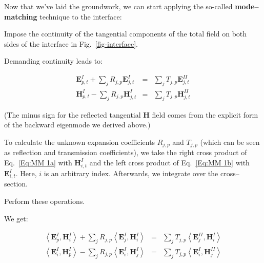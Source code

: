 \pagebreak


Now that we've laid the groundwork, we can start applying the so-called \textbf{mode--matching} technique to the interface:

\begin{cue}
Impose the continuity of the tangential components of the total field on both sides of the interface in Fig.~\ref{fig-interface}.  
\end{cue}

Demanding continuity leads to:  

\begin{eqnarray}
\mathbf{E}^{I}_{p,t}+\sum _{j}R_{j,p}\mathbf{E}^{I}_{j,t} & = & \sum _{j}T_{j,p}\mathbf{E}^{II}_{j,t}\label{Eq:MM 1a} \\
\mathbf{H}^{I}_{p,t}-\sum _{j}R_{j,p}\mathbf{H}^{I}_{j,t} & = & \sum _{j}T_{j,p}\mathbf{H}^{II}_{j,t}\label{Eq:MM 1b} 
\end{eqnarray}

(The minus sign for the reflected tangential ${\mathbf H}$ field comes from the explicit form of the backward eigenmode we derived above.)

To calculate the unknown expansion coefficients $R_{j,p}$ and $T_{j,p}$ (which can be seen as reflection and transmission coefficients), we take the right cross product of Eq.~\ref{Eq:MM 1a} with $\mathbf{H}^{I}_{i,t}$ and the left cross product of Eq.~\ref{Eq:MM 1b} with $\mathbf{E}^{I}_{i,t}$. Here, $i$ is an arbitrary index. Afterwards, we integrate over the cross--section.

\begin{cue}
  Perform these operations.
\end{cue}

We get:

\begin{eqnarray}
\left\langle \mathbf{E}^{I}_{p},\mathbf{H}^{I}_{i}\right\rangle +\sum _{j}R_{j,p}\left\langle \mathbf{E}^{I}_{j},\mathbf{H}^{I}_{i}\right\rangle  & = & \sum _{j}T_{j,p}\left\langle \mathbf{E}^{II}_{j},\mathbf{H}^{I}_{i}\right\rangle \label{Eq:MM 2a} \\
\left\langle \mathbf{E}^{I}_{i},\mathbf{H}^{I}_{p}\right\rangle -\sum _{j}R_{j,p}\left\langle \mathbf{E}^{I}_{i},\mathbf{H}^{I}_{j}\right\rangle  & = & \sum _{j}T_{j,p}\left\langle \mathbf{E}^{I}_{i},\mathbf{H}^{II}_{j}\right\rangle \label{Eq:MM 2b} 
\end{eqnarray}

